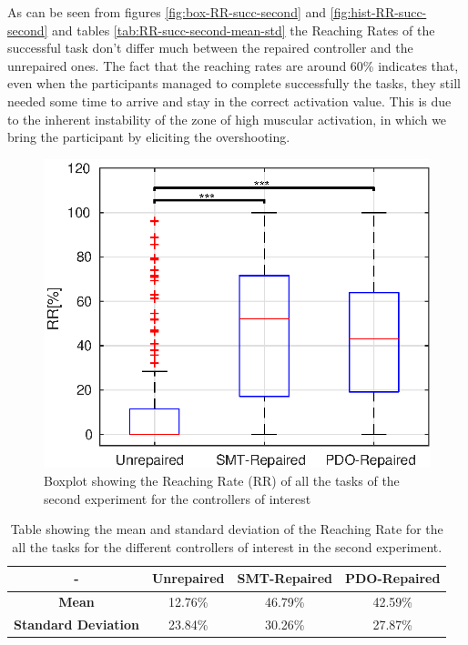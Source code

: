 As can be seen from figures \ref{fig:box-RR-succ-second} and \ref{fig:hist-RR-succ-second} and tables \ref{tab:RR-succ-second-mean-std} the Reaching Rates of the successful task don't differ much between the repaired controller and the unrepaired ones. The fact that the reaching rates are around 60\% indicates that, even when the participants managed to complete successfully the tasks, they still needed some time to arrive and stay in the correct activation value. This is due to the inherent instability of the zone of high muscular activation, in which we bring the participant by eliciting the overshooting.
%
%
\begin{figure}[H]
    \centering
    \includegraphics[width=\textwidth]{Images/second-experiment/exp1_RR_all_box.eps}
    \caption{Boxplot showing the Reaching Rate (RR) of all the tasks of the second experiment for the controllers of interest}
    \label{fig:box-RR-all-second}
\end{figure}
\begin{table}[H]
    \centering
    \begin{tabular}{|c|c|c|c|}
        \hline
        - & \textbf{Unrepaired} & \textbf{SMT-Repaired} & \textbf{PDO-Repaired} \\
        \hline
        \textbf{Mean} & 12.76\% & 46.79\% & 42.59\% \\
        \textbf{Standard Deviation} & 23.84\% & 30.26\% & 27.87\% \\
        \hline
    \end{tabular}
    \caption{Table showing the mean and standard deviation of the Reaching Rate for the all the tasks for the different controllers of interest in the second experiment.}
    \label{tab:RR-all-second-mean-std}
\end{table}
